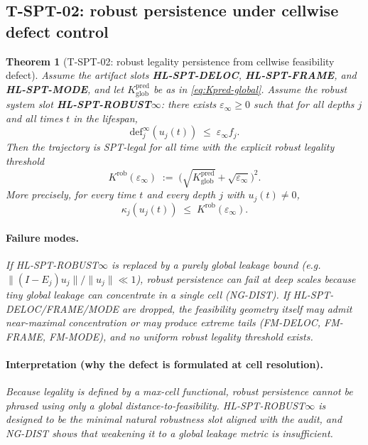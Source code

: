 \documentclass[11pt]{article}
\newtheorem{theorem}[definition]{Theorem}
\begin{document}
\subsection{T-SPT-02: robust persistence under cellwise defect control}

\begin{theorem}[T-SPT-02: robust legality persistence from cellwise feasibility defect]\label{thm:t-spt-02}
Assume the artifact slots \textbf{HL-SPT-DELOC}, \textbf{HL-SPT-FRAME}, and \textbf{HL-SPT-MODE}, and let $K^{\mathrm{pred}}_{\mathrm{glob}}$ be as in \eqref{eq:Kpred-global}.
Assume the robust system slot \textbf{HL-SPT-ROBUST$\infty$}: there exists $\varepsilon_\infty\ge 0$ such that for all depths $j$ and all times $t$ in the lifespan,
\[
\mathrm{def}^{\infty}_j(u_j(t)) \;\le\; \varepsilon_\infty f_j.
\]
Then the trajectory is SPT-legal for all time with the explicit robust legality threshold
\begin{equation}\label{eq:t-spt-02-Krob}
K^{\mathrm{rob}}(\varepsilon_\infty)
\;:=\;
\Big(\sqrt{K^{\mathrm{pred}}_{\mathrm{glob}}} + \sqrt{\varepsilon_\infty}\Big)^2.
\end{equation}
More precisely, for every time $t$ and every depth $j$ with $u_j(t)\neq 0$,
\begin{equation}\label{eq:t-spt-02-bound}
\kappa_j(u_j(t)) \;\le\; K^{\mathrm{rob}}(\varepsilon_\infty).
\end{equation}

\paragraph{Failure modes.}
If HL-SPT-ROBUST$\infty$ is replaced by a purely global leakage bound (e.g.\ $\|(I-E_j)u_j\|/\|u_j\|\ll 1$), robust persistence can fail at deep scales because tiny global leakage can concentrate in a single cell (NG-DIST).
If HL-SPT-DELOC/FRAME/MODE are dropped, the feasibility geometry itself may admit near-maximal concentration or may produce extreme tails (FM-DELOC, FM-FRAME, FM-MODE), and no uniform robust legality threshold exists.

\paragraph{Interpretation (why the defect is formulated at cell resolution).}
Because legality is defined by a max-cell functional, robust persistence cannot be phrased using only a global distance-to-feasibility.
HL-SPT-ROBUST$\infty$ is designed to be the minimal natural robustness slot aligned with the audit, and NG-DIST shows that weakening it to a global leakage metric is insufficient.
\end{theorem}
\end{document}
